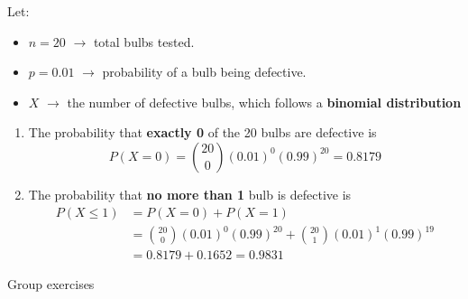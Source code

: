 \documentclass[10pt]{beamer}
\begin{document}
\begin{frame}


\vfill 
\begin{myyellowbox}[title=Solution]
Let:  
\begin{itemize}
\item $ n = 20$ $\rightarrow$ total bulbs tested. 
\item $ p = 0.01$ $\rightarrow$ probability of a bulb being defective.
\item   $X$ 	$\rightarrow$ the number of defective bulbs, which follows a \textbf{binomial distribution}
\end{itemize}

\begin{enumerate}
	\item The probability that \textbf{exactly 0} of the 20 bulbs are defective is
	\[P(X = 0) = \binom{20}{0} (0.01)^0 (0.99)^{20} = 0.8179\]
	\item The probability that \textbf{no more than 1} bulb is defective is
	\begin{align*}
	P(X \leq 1) & = P(X = 0) + P(X = 1) \\
	&= \binom{20}{0} (0.01)^0 (0.99)^{20} + \binom{20}{1} (0.01)^1 (0.99)^{19} \\
	& = 0.8179 + 0.1652 = 0.9831
	\end{align*}

\end{enumerate}
\end{myyellowbox}
	
\end{frame}




\begin{frame}[standout]
Group exercises
\end{frame}
\end{document}
